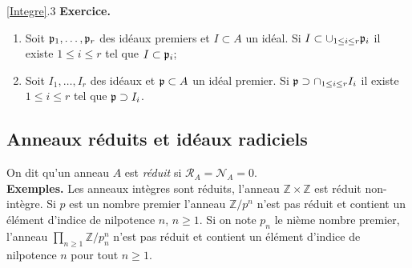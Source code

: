 \documentclass[a4paper, oneside, 12pt]{book}
\theoremstyle{theoremeStyle} %
\theoremstyle{definition} %
\newcommand{\Z}{\mathbb{Z}}
\begin{document}
\ref{Integre}.3 \textbf{Exercice.}\begin{enumerate}[leftmargin=* ,parsep=0cm,itemsep=0cm,topsep=0cm]
\item Soit $\frak{p}_1,\dots,\frak{p}_r$ des idéaux premiers et $I\subset A$ un idéal. Si $I\subset \cup_{1\leq i\leq r}\frak{p}_i$ il existe $1\leq i\leq r$ tel que $I\subset \frak{p}_i$;
\item Soit $I_1,\dots, I_r$ des idéaux   et $\frak{p}\subset A$ un idéal premier. Si $\frak{p}\supset \cap_{1\leq i\leq r}I_i$ il existe $1\leq i\leq r$ tel que $\frak{p}\supset I_i$.\\
\end{enumerate}





  \subsection{Anneaux réduits et idéaux radiciels}\label{Reduit} On dit qu'un anneau $A$ est \textit{réduit} si  $\mathcal{R}_A=\mathcal{N}_A=0$. \\
  \textbf{Exemples.} Les anneaux intègres sont réduits, l'anneau $\Z\times\Z$ est réduit non-intègre. Si $p$ est un nombre premier l'anneau  $\Z/p^n$ n'est  pas réduit et contient un élément d'indice de nilpotence $n$, $n\geq 1$. Si on note $p_n$ le nième nombre premier, l'anneau $\prod_{n\geq 1}\Z/p_n^n $ n'est  pas réduit et contient un élément d'indice de nilpotence $n$ pour tout $n\geq 1$.\\
\end{document}
